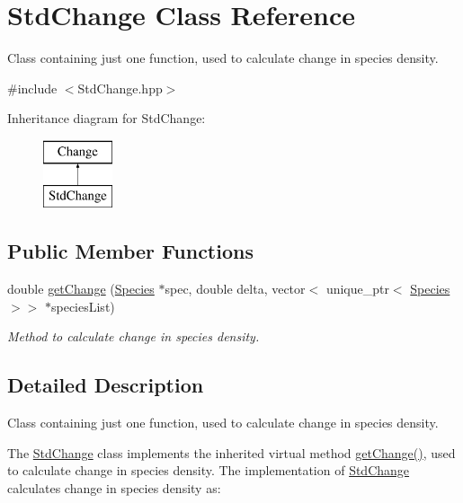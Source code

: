 \hypertarget{classStdChange}{}\section{Std\+Change Class Reference}
\label{classStdChange}


Class containing just one function, used to calculate change in species density.  




{\ttfamily \#include $<$Std\+Change.\+hpp$>$}

Inheritance diagram for Std\+Change\+:\begin{figure}[H]
\begin{center}
\leavevmode
\includegraphics[height=2.000000cm]{classStdChange}
\end{center}
\end{figure}
\subsection*{Public Member Functions}
\begin{DoxyCompactItemize}
\item 
double \hyperlink{classStdChange_a25fd1a3828d026e902bae809278c6dbc}{get\+Change} (\hyperlink{classSpecies}{Species} $\ast$spec, double delta, vector$<$ unique\+\_\+ptr$<$ \hyperlink{classSpecies}{Species} $>$$>$ $\ast$species\+List)
\begin{DoxyCompactList}\small\item\em Method to calculate change in species density. \end{DoxyCompactList}\end{DoxyCompactItemize}


\subsection{Detailed Description}
Class containing just one function, used to calculate change in species density. 

The \hyperlink{classStdChange}{Std\+Change} class implements the inherited virtual method \hyperlink{classStdChange_a25fd1a3828d026e902bae809278c6dbc}{get\+Change()}, used to calculate change in species density. The implementation of \hyperlink{classStdChange}{Std\+Change} calculates change in species density as\+:


